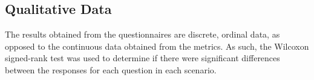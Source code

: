        

    \subsection{Qualitative Data}

        The results obtained from the questionnaires are discrete, ordinal data, as opposed to the continuous data obtained from the metrics. As such, the Wilcoxon signed-rank test was used to determine if there were significant differences between the responses for each question in each scenario.

